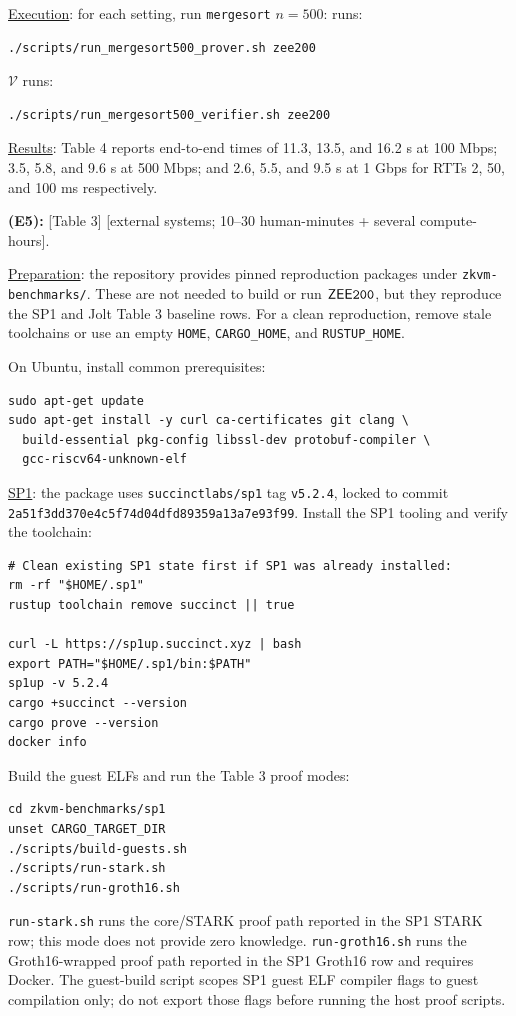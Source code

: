 \documentclass[nonacm,sigconf]{acmart}
\newcommand{\oursystem}{$\mathsf{ZEE}\tt{200}$\xspace}
\let\P\undefined
\newcommand{\P}{\ensuremath{\mathcal{P}}\xspace}
\newcommand{\V}{\ensuremath{\mathcal{V}}\xspace}
\begin{document}
\noindent
\underline{Execution}: for each setting, run \texttt{mergesort}
$n=500$:
\P runs:
\begin{verbatim}
./scripts/run_mergesort500_prover.sh zee200
\end{verbatim}
\V runs:
\begin{verbatim}
./scripts/run_mergesort500_verifier.sh zee200
\end{verbatim}

\noindent
\underline{Results}: Table 4 reports end-to-end times of 11.3, 13.5,
and 16.2 s at 100 Mbps; 3.5, 5.8, and 9.6 s at 500 Mbps; and 2.6,
5.5, and 9.5 s at 1 Gbps for RTTs 2, 50, and 100 ms respectively.

\textbf{(E5):} [Table 3] [external systems; 10--30 human-minutes +
several compute-hours].

\noindent
\underline{Preparation}: the repository provides pinned reproduction
packages under \texttt{zkvm-benchmarks/}. These are not needed to build
or run \oursystem, but they reproduce the SP1 and Jolt Table 3 baseline
rows. For a clean reproduction, remove stale toolchains or use an empty
\texttt{HOME}, \texttt{CARGO\_HOME}, and \texttt{RUSTUP\_HOME}.

On Ubuntu, install common prerequisites:
\begin{verbatim}
sudo apt-get update
sudo apt-get install -y curl ca-certificates git clang \
  build-essential pkg-config libssl-dev protobuf-compiler \
  gcc-riscv64-unknown-elf
\end{verbatim}

\noindent
\underline{SP1}: the package uses \texttt{succinctlabs/sp1} tag
\texttt{v5.2.4}, locked to commit
\texttt{2a51f3dd370e4c5f74d04dfd89359a13a7e93f99}. Install the SP1
tooling and verify the toolchain:
\begin{verbatim}
# Clean existing SP1 state first if SP1 was already installed:
rm -rf "$HOME/.sp1"
rustup toolchain remove succinct || true

curl -L https://sp1up.succinct.xyz | bash
export PATH="$HOME/.sp1/bin:$PATH"
sp1up -v 5.2.4
cargo +succinct --version
cargo prove --version
docker info
\end{verbatim}

Build the guest ELFs and run the Table 3 proof modes:
\begin{verbatim}
cd zkvm-benchmarks/sp1
unset CARGO_TARGET_DIR
./scripts/build-guests.sh
./scripts/run-stark.sh
./scripts/run-groth16.sh
\end{verbatim}
\texttt{run-stark.sh} runs the core/STARK proof path reported in the
SP1 STARK row; this mode does not provide zero knowledge.
\texttt{run-groth16.sh} runs the Groth16-wrapped proof path reported in
the SP1 Groth16 row and requires Docker. The guest-build script scopes
SP1 guest ELF compiler flags to guest compilation only; do not export
those flags before running the host proof scripts.
\end{document}
